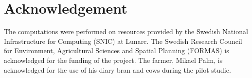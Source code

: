 \documentclass{cta-author}
\begin{document}
\section{Acknowledgement}
The computations were performed on resources provided by the Swedish National Infrastructure for Computing 
(SNIC) at Lunarc. The Swedish Research Council for Environment, Agricultural Sciences and 
Spatial Planning (FORMAS) is acknowledged 
for the funding of the project. The farmer, Mikael Palm, is acknowledged for the use of his diary bran and 
cows during the pilot studie.




{\parindent0pt
\parskip8pt

}
\end{document}
